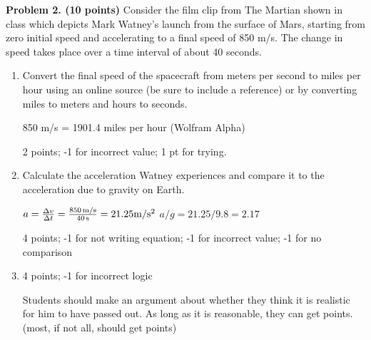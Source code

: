 \documentclass[12pt]{article}
\begin{document}
\vspace{1cm}

\noindent


\vspace{0.5cm}

\noindent
\textbf{Problem 2. (10 points)} Consider the film clip from The Martian shown in
class which depicts Mark Watney's launch from the surface of Mars, starting from
zero initial speed and accelerating to a final speed of 850 m/s. The change in
speed takes place over a time interval of about 40 seconds.

\begin{enumerate}
    \item[a.] Convert the final speed of the spacecraft from meters per second
    to miles per hour using an online source (be sure to include a reference) or
    by converting miles to meters and hours to seconds. 

    850 m/s = 1901.4 miles per hour (Wolfram Alpha)
    
    2 points; -1 for incorrect value; 1 pt for trying. 


    \item[b.] Calculate the acceleration Watney experiences and compare it to
    the acceleration due to gravity on Earth. 
    
    $a=\frac{\Delta v}{\Delta t} = \frac{850\,\rm{m/s}}{40\,\rm{s}} = 21.25\rm{m/s^2}$
    $a/g = 21.25/9.8 = 2.17$

    4 points; -1 for not writing equation; -1 for incorrect value; -1 for no comparison
    \item[c.] 4 points; -1 for incorrect logic
    
    Students should make an argument about whether they think it is realistic for him to have passed out. 
    As long as it is reasonable, they can get points. (most, if not all, should get points)
\end{enumerate}


\noindent
\end{document}
